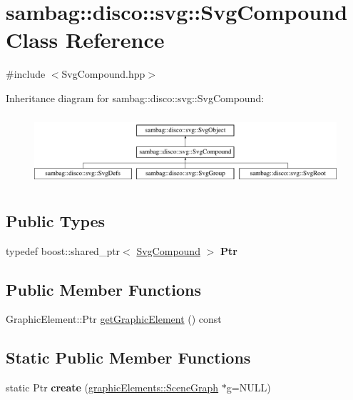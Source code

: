 \hypertarget{classsambag_1_1disco_1_1svg_1_1_svg_compound}{
\section{sambag::disco::svg::SvgCompound Class Reference}
\label{classsambag_1_1disco_1_1svg_1_1_svg_compound}
}


{\ttfamily \#include $<$SvgCompound.hpp$>$}

Inheritance diagram for sambag::disco::svg::SvgCompound:\begin{figure}[H]
\begin{center}
\leavevmode
\includegraphics[height=2.629108cm]{classsambag_1_1disco_1_1svg_1_1_svg_compound}
\end{center}
\end{figure}
\subsection*{Public Types}
\begin{DoxyCompactItemize}
\item 
\hypertarget{classsambag_1_1disco_1_1svg_1_1_svg_compound_a947fb6d7a19ded36f83bde3cad36a8e7}{
typedef boost::shared\_\-ptr$<$ \hyperlink{classsambag_1_1disco_1_1svg_1_1_svg_compound}{SvgCompound} $>$ {\bfseries Ptr}}
\label{classsambag_1_1disco_1_1svg_1_1_svg_compound_a947fb6d7a19ded36f83bde3cad36a8e7}

\end{DoxyCompactItemize}
\subsection*{Public Member Functions}
\begin{DoxyCompactItemize}
\item 
GraphicElement::Ptr \hyperlink{classsambag_1_1disco_1_1svg_1_1_svg_compound_ab0809c2e972c0242209ae7f997fa4787}{getGraphicElement} () const 
\end{DoxyCompactItemize}
\subsection*{Static Public Member Functions}
\begin{DoxyCompactItemize}
\item 
\hypertarget{classsambag_1_1disco_1_1svg_1_1_svg_compound_ae63edb533f739ddbe7fe15564dce567a}{
static Ptr {\bfseries create} (\hyperlink{classsambag_1_1disco_1_1graphic_elements_1_1_scene_graph}{graphicElements::SceneGraph} $\ast$g=NULL)}
\label{classsambag_1_1disco_1_1svg_1_1_svg_compound_ae63edb533f739ddbe7fe15564dce567a}

\end{DoxyCompactItemize}
